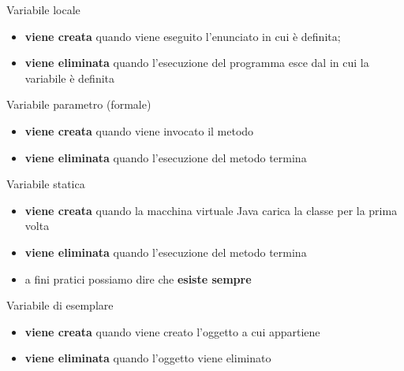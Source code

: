 \begin{frame}
\begin{block}{Variabile locale}
\begin{itemize}
\item \textbf{\alert{viene creata}} quando viene eseguito l'enunciato in cui è definita;
\item \textbf{\alert{viene eliminata}} quando l'esecuzione del programma esce dal \textbf{} in cui la 
variabile è definita
\end{itemize}
\end{block}
\vspace{0.9cm}
\begin{block}{Variabile parametro (formale)}
\begin{itemize}
\item \textbf{\alert{viene creata}} quando viene invocato il metodo
\item \textbf{\alert{viene eliminata}} quando l'esecuzione del metodo termina
\end{itemize}
\end{block}
\end{frame}

\begin{frame}
\begin{block}{Variabile statica}
\begin{itemize}
\item \textbf{\alert{viene creata}} quando la macchina virtuale Java carica la classe per la prima volta
\item \textbf{\alert{viene eliminata}} quando l'esecuzione del metodo termina
\item a fini pratici possiamo dire che \textbf{esiste sempre}
\end{itemize}
\end{block}
\vspace{0.9cm}
\begin{block}{Variabile di esemplare}
\begin{itemize}
\item \textbf{\alert{viene creata}} quando viene creato l'oggetto a cui appartiene
\item \textbf{\alert{viene eliminata}} quando l'oggetto viene eliminato
\end{itemize}
\end{block}
\end{frame}

